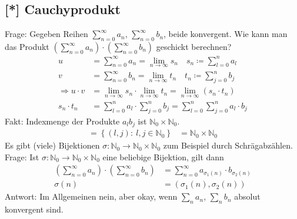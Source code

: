 \documentclass[11pt, twoside, a4paper]{article}
\theoremstyle{plain}
\newcommand{\set}[1]{\left\{#1\right\}}
\newcommand{\pair}[1]{\left(#1\right)}
\newcommand{\impl}[0]{\Rightarrow{}}
\newcommand{\definedas}[0]{\coloneqq}
\newcommand{\fromto}{\rightarrow{}}
\newcommand{\N}{\mathbb{N}}
\begin{document}
    \subsection{[*] Cauchyprodukt}
    Frage: Gegeben Reihen $\sum_{n=0}^{\infty} a_n$, $\sum_{n=0}^{\infty} b_n$, beide konvergent. Wie kann man das Produkt $\pair{\sum_{n=0}^{\infty} a_n}\cdot\pair{\sum_{n=0}^{\infty} b_n}$ geschickt berechnen?\\
    \begin{align*}
        u &= \sum_{n=0}^{\infty} a_n = \lim_{n\fromto\infty} s_n\quad s_n \definedas \sum_{l=0}^{n} a_l\\
        v &= \sum_{n=0}^{\infty} b_n = \lim_{n\fromto\infty} t_n \quad t_n \definedas \sum_{j=0}^{n} b_j\\
        \impl u\cdot v &= \lim_{n\fromto\infty} s_n \cdot \lim_{n\fromto\infty} t_n = \lim_{n\fromto\infty} \pair{s_n\cdot t_n}\\[10pt]
        s_n \cdot t_n &= \sum_{l=0}^{n} a_l \cdot \sum_{j=0}^{n} b_j = \sum_{l=0}^{n} \sum_{j=0}^{n} a_l\cdot b_j
    \end{align*}
    Fakt: Indexmenge der Produkte $a_l b_j$ ist $\N_0 \times \N_0$.
    \begin{align*}
        = \set{(l,j):~l,j\in\N_0} &= \N_0\times\N_0
    \end{align*}
    Es gibt (viele) Bijektionen $\sigma: \N_0 \fromto \N_0\times\N_0$ zum Beispiel durch Schrägabzählen.\\
    Frage: Ist $\sigma: \N_0 \fromto \N_0\times\N_0$ eine beliebige Bijektion, gilt dann
    \begin{align*}
        \pair{\sum_{n=0}^{\infty} a_n}\cdot\pair{\sum_{n=0}^{\infty} b_n} &= \sum_{n=0}^{\infty} a_{\sigma_1(n)}\cdot b_{\sigma_2(n)}\\
        \sigma(n) &= \pair{\sigma_1(n), \sigma_2(n)}
    \end{align*}
    Antwort: Im Allgemeinen nein, aber okay, wenn $\sum_{n}^{} a_n$, $\sum_{n}^{} b_n$ absolut konvergent sind.
\end{document}
